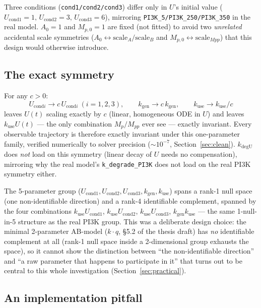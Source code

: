 \documentclass[11pt]{article}
\newcommand{\code}[1]{\texttt{#1}}
\begin{document}
Three conditions (\code{cond1/cond2/cond3}) differ only in $U$'s initial
value ($U_{\text{cond1}}=1,\,U_{\text{cond2}}=3,\,U_{\text{cond3}}=6$),
mirroring \code{PI3K\_5/PI3K\_250/PI3K\_350} in the real model. $A_0=1$ and
$M_{p,0}=1$ are fixed (not fitted) to avoid two \emph{unrelated} accidental
scale symmetries ($A_0 \leftrightarrow \mathrm{scale}_A/\mathrm{scale}_B$ and
$M_{p,0} \leftrightarrow \mathrm{scale}_{Mpp}$) that this design would
otherwise introduce.

\subsection{The exact symmetry}

For any $c>0$:
\[
U_{\text{cond}i} \to c\,U_{\text{cond}i}\ (i=1,2,3), \qquad
k_{\text{gen}} \to c\,k_{\text{gen}}, \qquad
k_{\text{use}} \to k_{\text{use}}/c
\]
leaves $U(t)$ scaling exactly by $c$ (linear, homogeneous ODE in $U$) and
leaves $k_{\text{use}}U(t)$ --- the only combination $M_p/M_{pp}$ ever see ---
exactly invariant. Every observable trajectory is therefore exactly invariant
under this one-parameter family, verified numerically to solver precision
($\sim 10^{-7}$, Section~\ref{sec:clean}). $k_{\text{degU}}$ does \emph{not}
load on this symmetry (linear decay of $U$ needs no compensation), mirroring
why the real model's \code{k\_degrade\_PI3K} does not load on the real PI3K
symmetry either.

The 5-parameter group ($U_{\text{cond1}},U_{\text{cond2}},U_{\text{cond3}},
k_{\text{gen}},k_{\text{use}}$) spans a rank-1 null space (one non-identifiable
direction) and a rank-4 identifiable complement, spanned by the four
combinations $k_{\text{use}}U_{\text{cond1}}$, $k_{\text{use}}U_{\text{cond2}}$,
$k_{\text{use}}U_{\text{cond3}}$, $k_{\text{gen}}k_{\text{use}}$ --- the same
1-null-in-5 structure as the real PI3K group. This was a deliberate design
choice: the minimal 2-parameter AB-model ($k\cdot q$, \S5.2 of the thesis
draft) has \emph{no} identifiable complement at all (rank-1 null space inside
a 2-dimensional group exhausts the space), so it cannot show the distinction
between ``the non-identifiable direction'' and ``a raw parameter that happens
to participate in it'' that turns out to be central to this whole
investigation (Section~\ref{sec:practical}).

\subsection{An implementation pitfall}
\label{sec:pitfall}
\end{document}
